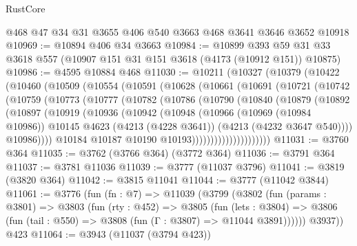 \begin{lexlean}{RustCore}
\begin{coremodule}
    @468
    @47
    @34
    @31
    @3655
    @406
    @540
    @3663
    @468
    @3641
    @3646
    @3652
    @10918
@10969 := @10894 @406 @34 @3663
@10984 := @10899
    @393
    @59
    @31
    @33
    @3618
    @557
    (@10907 @151 @31 @151 @3618 (@4173 (@10912 @151)) @10875)
@10986 := @4595 @10884 @468
@11030 := @10211
    (@10327
      (@10379
        (@10422
          (@10460
            (@10509
              (@10554
                (@10591
                  (@10628
                    (@10661
                      (@10691
                        (@10721
                          (@10742
                            (@10759
                              (@10773
                                (@10777
                                  (@10782
                                    (@10786
                                      (@10790
                                        (@10840
                                          (@10879
                                            (@10892
                                              (@10897
                                                (@10919
                                                  (@10936
                                                    (@10942
                                                      (@10948
                                                        (@10966
                                                          (@10969 (@10984 @10986))
                                                          @10145
                                                          @4623
                                                          (@4213 (@4228 @3641))
                                                          (@4213 (@4232 @3647 @540))))
                                                      @10986))))
                                              @10184
                                              @10187
                                              @10190
                                              @10193)))))))))))))))))))))
@11031 := @3760 @364
@11035 := @3762 (@3766 @364) (@3772 @364)
@11036 := @3791 @364
@11037 := @3781 @11036
@11039 := @3777 (@11037 @3796)
@11041 := @3819 (@3820 @364)
@11042 := @3815 @11041
@11044 := @3777 (@11042 @3844)
@11061 := @3776
    (fun (fn : @7) =>
    @11039
      (@3799
        (@3802
          (fun (params : @3801) =>
          @3803
            (fun (rty : @452) =>
            @3805
              (fun (lets : @3804) =>
              @3806 (fun (tail : @550) => @3808 (fun (Γ : @3807) => @11044 @3891))))))
        @3937))
    @423
@11064 := @3943 (@11037 (@3794 @423))

\end{coremodule}
\end{lexlean}
